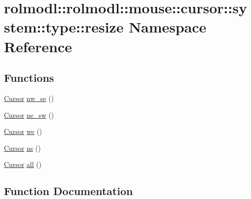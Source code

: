 \hypertarget{namespacerolmodl_1_1rolmodl_1_1mouse_1_1cursor_1_1system_1_1type_1_1resize}{}\section{rolmodl\+::rolmodl\+::mouse\+::cursor\+::system\+::type\+::resize Namespace Reference}
\label{namespacerolmodl_1_1rolmodl_1_1mouse_1_1cursor_1_1system_1_1type_1_1resize}
\subsection*{Functions}
\begin{DoxyCompactItemize}
\item 
\mbox{\hyperlink{classrolmodl_1_1rolmodl_1_1mouse_1_1_cursor}{Cursor}} \mbox{\hyperlink{namespacerolmodl_1_1rolmodl_1_1mouse_1_1cursor_1_1system_1_1type_1_1resize_ae5bbf80a7e212005c1c097907851b53e}{nw\+\_\+se}} ()
\item 
\mbox{\hyperlink{classrolmodl_1_1rolmodl_1_1mouse_1_1_cursor}{Cursor}} \mbox{\hyperlink{namespacerolmodl_1_1rolmodl_1_1mouse_1_1cursor_1_1system_1_1type_1_1resize_aad50235685c466722811637bdebaf30b}{ne\+\_\+sw}} ()
\item 
\mbox{\hyperlink{classrolmodl_1_1rolmodl_1_1mouse_1_1_cursor}{Cursor}} \mbox{\hyperlink{namespacerolmodl_1_1rolmodl_1_1mouse_1_1cursor_1_1system_1_1type_1_1resize_a31aa78a5edfe6cc34ec6c129b74d5506}{we}} ()
\item 
\mbox{\hyperlink{classrolmodl_1_1rolmodl_1_1mouse_1_1_cursor}{Cursor}} \mbox{\hyperlink{namespacerolmodl_1_1rolmodl_1_1mouse_1_1cursor_1_1system_1_1type_1_1resize_a51c0dd61cd462de8dd85e3262658a42d}{ns}} ()
\item 
\mbox{\hyperlink{classrolmodl_1_1rolmodl_1_1mouse_1_1_cursor}{Cursor}} \mbox{\hyperlink{namespacerolmodl_1_1rolmodl_1_1mouse_1_1cursor_1_1system_1_1type_1_1resize_ac137ffd798d3a64ea6d173778f5a980d}{all}} ()
\end{DoxyCompactItemize}


\subsection{Function Documentation}
\mbox{\label{namespacerolmodl_1_1rolmodl_1_1mouse_1_1cursor_1_1system_1_1type_1_1resize_ac137ffd798d3a64ea6d173778f5a980d}} 
